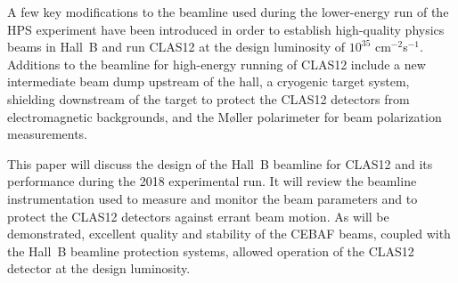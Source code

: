 A few key modifications to the beamline used during the lower-energy run of the HPS experiment
\cite{HPSBeamline} have been introduced in order to establish high-quality physics beams in Hall~B and run
CLAS12 at the design luminosity of $10^{35}$ cm$^{-2}$s$^{-1}$. Additions to the beamline for high-energy
running of CLAS12 include a new intermediate beam dump upstream of the hall, a cryogenic target system,
shielding downstream of the target to protect the CLAS12 detectors from electromagnetic backgrounds, and
the M{\o}ller polarimeter for beam polarization measurements.   

This paper will discuss the design of the Hall~B beamline for CLAS12 and its performance during the 2018
experimental run. It will review the beamline instrumentation used to measure and monitor the beam parameters
and to protect the CLAS12 detectors against errant beam motion. As will be demonstrated, excellent quality and
stability of the CEBAF beams, coupled with the Hall~B beamline protection systems, allowed operation of the
CLAS12 detector at the design luminosity.
